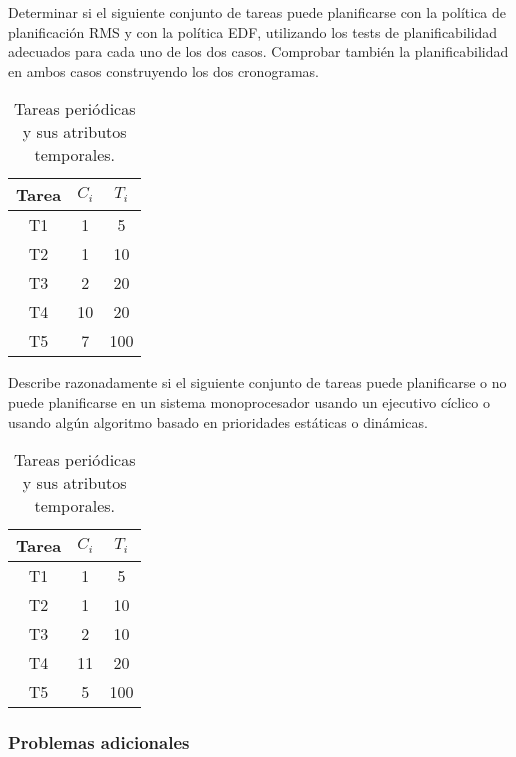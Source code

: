 \begin{ejercicio}\label{ej:rel4_6}
    Determinar si el siguiente conjunto de tareas puede planificarse con la política de planificación RMS y con la política EDF, utilizando los tests de planificabilidad adecuados para cada uno de los dos casos. Comprobar también la planificabilidad en ambos casos construyendo los dos cronogramas.
    \begin{table}[H]
    \centering
    \begin{tabular}{|c|c|c|}
        \hline
        Tarea & $C_i$ & $T_i$ \\
        \hline
        T1 & 1 & 5 \\
        \hline
        T2 & 1 & 10 \\
        \hline
        T3 & 2 & 20 \\
        \hline
        T4 & 10 & 20 \\
        \hline
        T5 & 7 & 100 \\
        \hline
    \end{tabular}
    \caption{Tareas periódicas y sus atributos temporales.}
    \label{tab:4_6}
    \end{table}
\end{ejercicio}

\begin{ejercicio}\label{ej:rel4_7}
    Describe razonadamente si el siguiente conjunto de tareas puede planificarse o no puede planificarse en un sistema monoprocesador usando un ejecutivo cíclico o usando algún algoritmo basado en prioridades estáticas o dinámicas.
    \begin{table}[H]
    \centering
    \begin{tabular}{|c|c|c|}
        \hline
        Tarea & $C_i$ & $T_i$ \\
        \hline
        T1 & 1 & 5 \\
        \hline
        T2 & 1 & 10 \\
        \hline
        T3 & 2 & 10 \\
        \hline
        T4 & 11 & 20 \\
        \hline
        T5 & 5 & 100 \\
        \hline
    \end{tabular}
    \caption{Tareas periódicas y sus atributos temporales.}
    \label{tab:4_7}
    \end{table}
\end{ejercicio}

\subsubsection{Problemas adicionales}

